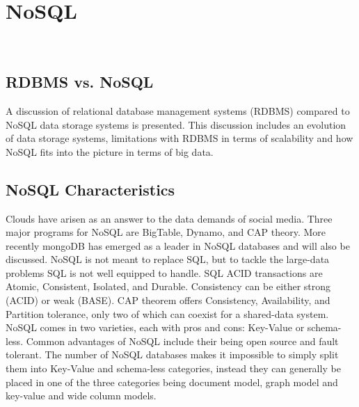 \chapter{NoSQL}
\label{c:nosql}

\FILENAME\


\section{RDBMS vs. NoSQL}

A discussion of relational database management systems (RDBMS)
compared to NoSQL data storage systems is presented. This discussion
includes an evolution of data storage systems, limitations with RDBMS
in terms of scalability and how NoSQL fits into the picture in terms
of big data. 
  



\section{NoSQL Characteristics}

Clouds have arisen as an answer to the data demands of social media.
Three major programs for NoSQL are BigTable, Dynamo, and CAP theory.
More recently mongoDB has emerged as a leader in NoSQL databases and
will also be discussed. NoSQL is not meant to replace SQL, but to
tackle the large-data problems SQL is not well equipped to handle. SQL
ACID transactions are Atomic, Consistent, Isolated, and
Durable. Consistency can be either strong (ACID) or weak (BASE). CAP
theorem offers Consistency, Availability, and Partition tolerance,
only two of which can coexist for a shared-data system. NoSQL comes in
two varieties, each with pros and cons: Key-Value or
schema-less. Common advantages of NoSQL include their being open
source and fault tolerant. The number of NoSQL databases makes it
impossible to simply split them into Key-Value and schema-less
categories, instead they can generally be placed in one of the three
categories being document model, graph model and key-value and wide
column models. 


